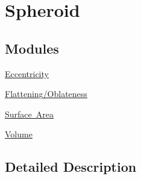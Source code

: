 \hypertarget{group___e_g_x_math-_geometry-3_d-_spheroid}{}\section{Spheroid}
\label{group___e_g_x_math-_geometry-3_d-_spheroid}
\subsection*{Modules}
\begin{DoxyCompactItemize}
\item 
\mbox{\hyperlink{group___e_g_x_math-_geometry-3_d-_spheroid-_eccentricity}{Eccentricity}}
\item 
\mbox{\hyperlink{group___e_g_x_math-_geometry-3_d-_spheroid-_flattening}{Flattening/\+Oblateness}}
\item 
\mbox{\hyperlink{group___e_g_x_math-_geometry-3_d-_spheroid-_surface_area}{Surface Area}}
\item 
\mbox{\hyperlink{group___e_g_x_math-_geometry-3_d-_spheroid-_volume}{Volume}}
\end{DoxyCompactItemize}


\subsection{Detailed Description}
